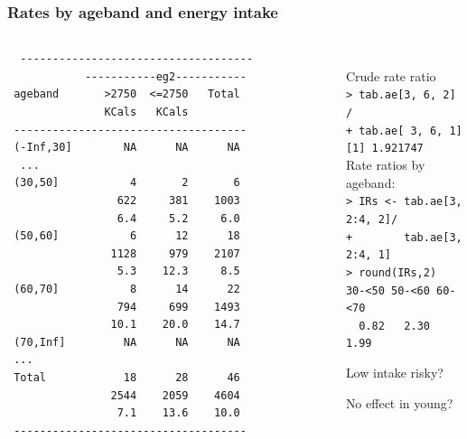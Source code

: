 \documentclass[handout,12pt]{beamer}
\begin{document}

\begin{frame}
[fragile]
 \frametitle{Rates by ageband and energy intake}
 
\begin{columns}
\begin{column}[t]{0.50\textwidth}
{\scriptsize
\begin{verbatim}
  ------------------------------------ 
            -----------eg2----------- 
 ageband       >2750  <=2750   Total  
               KCals   KCals          
 ------------------------------------ 
 (-Inf,30]        NA      NA      NA  
  ...                                     
 (30,50]           4       2       6  
                 622     381    1003  
                 6.4     5.2     6.0                                      
 (50,60]           6      12      18  
                1128     979    2107  
                 5.3    12.3     8.5                                      
 (60,70]           8      14      22  
                 794     699    1493  
                10.1    20.0    14.7                                      
 (70,Inf]         NA      NA      NA
 ...                                      
 Total            18      28      46  
                2544    2059    4604  
                 7.1    13.6    10.0  
 ------------------------------------ 
\end{verbatim}
}
\end{column}
\begin{column}[t]{0.45\textwidth}

\ \\
\small
Crude rate ratio\\
\verb|> tab.ae[3, 6, 2] /| \\
\verb|+ tab.ae[ 3, 6, 1] | \\
\verb|[1] 1.921747| \\

\medskip
Rate ratios %
 by ageband: \\
\verb|> IRs <- tab.ae[3, 2:4, 2]/|\\ 
\verb|+        tab.ae[3, 2:4, 1]|\\         
\verb|> round(IRs,2)|\\
\verb|30-<50 50-<60 60-<70|\\ 
\verb|  0.82   2.30   1.99| 
\bi
\item Low intake risky?
\item No effect in young?
\ei
\normalsize
\end{column}
\end{columns}
\end{frame} 
\end{document}
